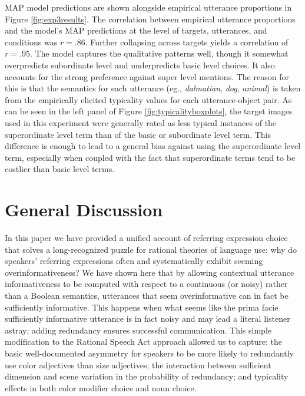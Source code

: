 \documentclass[11pt]{article}
\newcommand{\figref}[1]{Figure \ref{#1}}
\begin{document}
MAP model  predictions are shown alongside empirical utterance proportions in \figref{fig:exp3results}. 
The correlation between empirical utterance proportions and the model's MAP predictions at the level of targets, utterances, and conditions was $r = .86$. Further collapsing across targets yields a correlation of $r = .95$.
The model captures the qualitative patterns well, though it somewhat overpredicts subordinate level  and underpredicts basic level choices. It also accounts for the strong preference against super level mentions. The reason for this is that the semantics for each utterance (eg., \emph{dalmatian}, \emph{dog}, \emph{animal}) is taken from the empirically elicited typicality values for each utterance-object pair. As can be seen in the left panel of \figref{fig:typicalityboxplots},  the target images used in this experiment were generally rated as less typical instances of the superordinate level term than of the basic or subordinate level term. This difference is enough to lead to a general bias against using the superordinate level term, especially when coupled with the fact that superordinate terms tend to be costlier than basic level terms.


\section{General Discussion}
\label{sec:gd}

In this paper we have provided a unified account of referring expression choice that solves a long-recognized puzzle for rational theories of language use: why do speakers'  referring expressions often and systematically exhibit seeming overinformativeness? We have shown here that by allowing contextual utterance informativeness to be computed with respect to a continuous (or noisy) rather than a Boolean semantics, utterances that seem overinformative can in fact be sufficiently informative. This happens when what seems like the prima facie sufficiently informative utterance is in fact noisy and may lead a literal listener astray; adding redundancy ensures successful communication. This simple modification to the Rational Speech Act approach allowed us to capture: the basic well-documented asymmetry for speakers to be more likely to redundantly use color adjectives than size adjectives; the interaction between sufficient dimension and scene variation in the probability of redundancy; and typicality effects in both color modifier choice and noun choice. 
\end{document}
